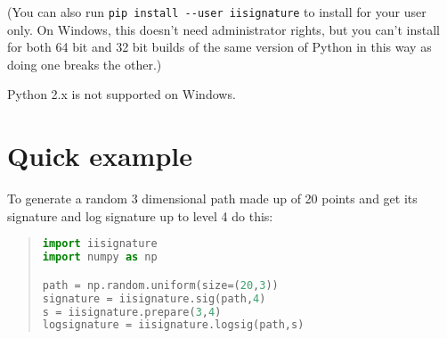 \documentclass[a4paper]{extarticle}
\begin{document}
{\small (You can also run \verb|pip install --user iisignature| to install for your user only. On Windows, this doesn't need administrator rights, but you can't install for both 64 bit and 32 bit builds of the same version of Python in this way as doing one breaks the other.)}

Python 2.x is not supported on Windows.



\newpage
\section{Quick example}
To generate a random 3 dimensional path made up of 20 points and get its signature and log signature up to level 4 do this:
\begin{quotation}
\begin{lstlisting}[frame=single,language=Python,keywordstyle=\bf]
import iisignature
import numpy as np

path = np.random.uniform(size=(20,3))
signature = iisignature.sig(path,4)
s = iisignature.prepare(3,4)
logsignature = iisignature.logsig(path,s)
\end{lstlisting}
\end{quotation}
\end{document}
